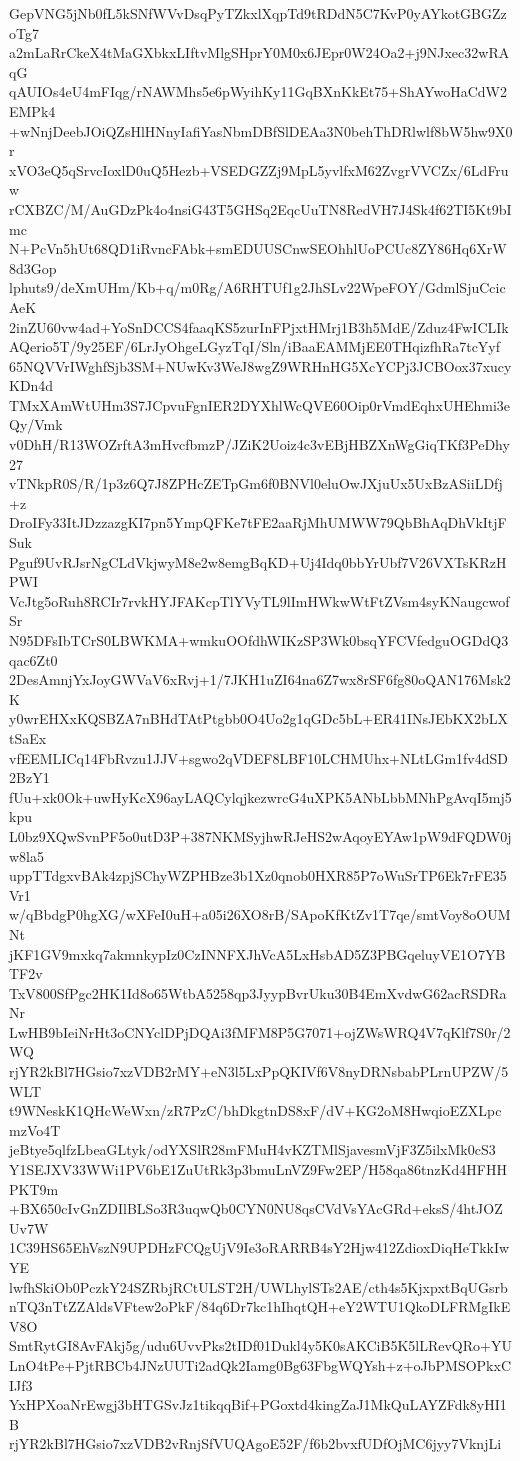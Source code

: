 GepVNG5jNb0fL5kSNfWVvDsqPyTZkxlXqpTd9tRDdN5C7KvP0yAYkotGBGZzoTg7
a2mLaRrCkeX4tMaGXbkxLIftvMlgSHprY0M0x6JEpr0W24Oa2+j9NJxec32wRAqG
qAUIOs4eU4mFIqg/rNAWMhs5e6pWyihKy11GqBXnKkEt75+ShAYwoHaCdW2EMPk4
+wNnjDeebJOiQZsHlHNnyIafiYasNbmDBfSlDEAa3N0behThDRlwlf8bW5hw9X0r
xVO3eQ5qSrvcIoxlD0uQ5Hezb+VSEDGZZj9MpL5yvlfxM62ZvgrVVCZx/6LdFruw
rCXBZC/M/AuGDzPk4o4nsiG43T5GHSq2EqcUuTN8RedVH7J4Sk4f62TI5Kt9bImc
N+PcVn5hUt68QD1iRvncFAbk+smEDUUSCnwSEOhhlUoPCUc8ZY86Hq6XrW8d3Gop
lphuts9/deXmUHm/Kb+q/m0Rg/A6RHTUf1g2JhSLv22WpeFOY/GdmlSjuCcicAeK
2inZU60vw4ad+YoSnDCCS4faaqKS5zurInFPjxtHMrj1B3h5MdE/Zduz4FwICLIk
AQerio5T/9y25EF/6LrJyOhgeLGyzTqI/Sln/iBaaEAMMjEE0THqizfhRa7tcYyf
65NQVVrIWghfSjb3SM+NUwKv3WeJ8wgZ9WRHnHG5XcYCPj3JCBOox37xucyKDn4d
TMxXAmWtUHm3S7JCpvuFgnIER2DYXhlWcQVE60Oip0rVmdEqhxUHEhmi3eQy/Vmk
v0DhH/R13WOZrftA3mHvcfbmzP/JZiK2Uoiz4c3vEBjHBZXnWgGiqTKf3PeDhy27
vTNkpR0S/R/1p3z6Q7J8ZPHcZETpGm6f0BNVl0eluOwJXjuUx5UxBzASiiLDfj+z
DroIFy33ItJDzzazgKI7pn5YmpQFKe7tFE2aaRjMhUMWW79QbBhAqDhVkItjFSuk
Pguf9UvRJsrNgCLdVkjwyM8e2w8emgBqKD+Uj4Idq0bbYrUbf7V26VXTsKRzHPWI
VcJtg5oRuh8RCIr7rvkHYJFAKcpTlYVyTL9lImHWkwWtFtZVsm4syKNaugcwofSr
N95DFsIbTCrS0LBWKMA+wmkuOOfdhWIKzSP3Wk0bsqYFCVfedguOGDdQ3qac6Zt0
2DesAmnjYxJoyGWVaV6xRvj+1/7JKH1uZI64na6Z7wx8rSF6fg80oQAN176Msk2K
y0wrEHXxKQSBZA7nBHdTAtPtgbb0O4Uo2g1qGDc5bL+ER41INsJEbKX2bLXtSaEx
vfEEMLICq14FbRvzu1JJV+sgwo2qVDEF8LBF10LCHMUhx+NLtLGm1fv4dSD2BzY1
fUu+xk0Ok+uwHyKcX96ayLAQCylqjkezwrcG4uXPK5ANbLbbMNhPgAvqI5mj5kpu
L0bz9XQwSvnPF5o0utD3P+387NKMSyjhwRJeHS2wAqoyEYAw1pW9dFQDW0jw8la5
uppTTdgxvBAk4zpjSChyWZPHBze3b1Xz0qnob0HXR85P7oWuSrTP6Ek7rFE35Vr1
w/qBbdgP0hgXG/wXFeI0uH+a05i26XO8rB/SApoKfKtZv1T7qe/smtVoy8oOUMNt
jKF1GV9mxkq7akmnkypIz0CzINNFXJhVcA5LxHsbAD5Z3PBGqeluyVE1O7YBTF2v
TxV800SfPgc2HK1Id8o65WtbA5258qp3JyypBvrUku30B4EmXvdwG62acRSDRaNr
LwHB9bIeiNrHt3oCNYclDPjDQAi3fMFM8P5G7071+ojZWsWRQ4V7qKlf7S0r/2WQ
rjYR2kBl7HGsio7xzVDB2rMY+eN3l5LxPpQKIVf6V8nyDRNsbabPLrnUPZW/5WLT
t9WNeskK1QHcWeWxn/zR7PzC/bhDkgtnDS8xF/dV+KG2oM8HwqioEZXLpcmzVo4T
jeBtye5qlfzLbeaGLtyk/odYXSlR28mFMuH4vKZTMlSjavesmVjF3Z5ilxMk0cS3
Y1SEJXV33WWi1PV6bE1ZuUtRk3p3bmuLnVZ9Fw2EP/H58qa86tnzKd4HFHHPKT9m
+BX650cIvGnZDIlBLSo3R3uqwQb0CYN0NU8qsCVdVsYAcGRd+eksS/4htJOZUv7W
1C39HS65EhVszN9UPDHzFCQgUjV9Ie3oRARRB4sY2Hjw412ZdioxDiqHeTkkIwYE
lwfhSkiOb0PczkY24SZRbjRCtULST2H/UWLhylSTs2AE/cth4s5KjxpxtBqUGsrb
nTQ3nTtZZAldsVFtew2oPkF/84q6Dr7kc1hIhqtQH+eY2WTU1QkoDLFRMgIkEV8O
SmtRytGI8AvFAkj5g/udu6UvvPks2tIDf01Dukl4y5K0sAKCiB5K5lLRevQRo+YU
LnO4tPe+PjtRBCb4JNzUUTi2adQk2Iamg0Bg63FbgWQYsh+z+oJbPMSOPkxCIJf3
YxHPXoaNrEwgj3bHTGSvJz1tikqqBif+PGoxtd4kingZaJ1MkQuLAYZFdk8yHI1B
rjYR2kBl7HGsio7xzVDB2vRnjSfVUQAgoE52F/f6b2bvxfUDfOjMC6jyy7VknjLi

